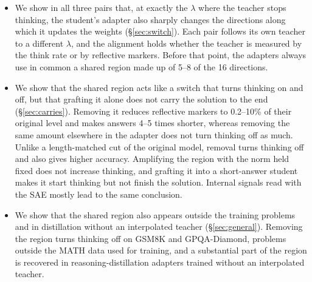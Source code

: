 \begin{itemize}
  \item We show in all three pairs that, at exactly the $\lambda$ where the teacher stops thinking, the student's adapter also sharply changes the directions along which it updates the weights (\S\ref{sec:switch}). Each pair follows its own teacher to a different $\lambda$, and the alignment holds whether the teacher is measured by the think rate or by reflective markers. Before that point, the adapters always use in common a shared region made up of 5--8 of the 16 directions.
  \item We show that the shared region acts like a switch that turns thinking on and off, but that grafting it alone does not carry the solution to the end (\S\ref{sec:carries}). Removing it reduces reflective markers to 0.2--10\% of their original level and makes answers 4--5 times shorter, whereas removing the same amount elsewhere in the adapter does not turn thinking off as much. Unlike a length-matched cut of the original model, removal turns thinking off and also gives higher accuracy. Amplifying the region with the norm held fixed does not increase thinking, and grafting it into a short-answer student makes it start thinking but not finish the solution. Internal signals read with the SAE mostly lead to the same conclusion.
  \item We show that the shared region also appears outside the training problems and in distillation without an interpolated teacher (\S\ref{sec:general}). Removing the region turns thinking off on GSM8K and GPQA-Diamond, problems outside the MATH data used for training, and a substantial part of the region is recovered in reasoning-distillation adapters trained without an interpolated teacher.
\end{itemize}
